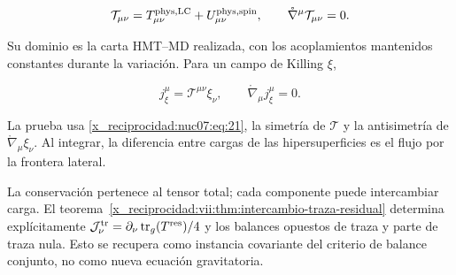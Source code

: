 \begin{equation}
\mathcal T_{\mu\nu}
=T^{\rm phys,LC}_{\mu\nu}+U^{\rm phys,spin}_{\mu\nu},
\qquad
\mathring\nabla^\mu\mathcal T_{\mu\nu}=0.
\label{x_reciprocidad:nuc07:eq:21}
\end{equation}

Su dominio es la carta HMT–MD realizada, con los acoplamientos mantenidos constantes durante la variación. Para un campo de Killing \(\xi\),

\begin{equation}
j^\mu_\xi=\mathcal T^{\mu\nu}\xi_\nu,\qquad
\mathring\nabla_\mu j^\mu_\xi=0.
\label{x_reciprocidad:nuc07:eq:22}
\end{equation}

La prueba usa \eqref{x_reciprocidad:nuc07:eq:21}, la simetría de \(\mathcal T\) y la antisimetría de \(\mathring\nabla_\mu\xi_\nu\). Al integrar, la diferencia entre cargas de las hipersuperficies es el flujo por la frontera lateral.

La conservación pertenece al tensor total; cada componente puede intercambiar carga. El teorema~\ref{x_reciprocidad:vii:thm:intercambio-traza-residual} determina explícitamente \(\mathcal J^{\rm tr}_\nu=\partial_\nu\operatorname{tr}_g(T^{\rm res})/4\) y los balances opuestos de traza y parte de traza nula. Esto se recupera como instancia covariante del criterio de balance conjunto, no como nueva ecuación gravitatoria.
